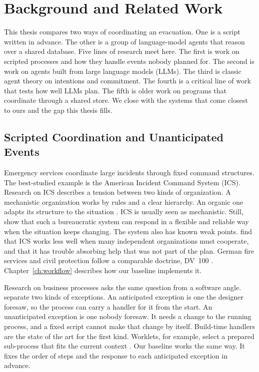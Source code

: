 \chapter{Background and Related Work}
\label{ch:background}

This thesis compares two ways of coordinating an evacuation. One is a script
written in advance. The other is a group of language-model agents that reason
over a shared database. Five lines of research meet here. The first is work on
scripted processes and how they handle events nobody planned for. The second is
work on agents built from large language models (LLMs). The third is classic
agent theory on intentions and commitment. The fourth is a critical line of
work that tests how well LLMs plan. The fifth is older work on programs that
coordinate through a shared store. We close with the systems that
come closest to ours and the gap this thesis fills.

\section{Scripted Coordination and Unanticipated Events}
\label{sec:bg:workflow}

Emergency services coordinate large incidents through fixed command
structures. The best-studied example is the American Incident Command System
(ICS). Research on ICS describes a tension between two kinds of organization.
A mechanistic organization works by rules and a clear hierarchy. An organic one
adapts its structure to the situation \parencite{chang2017}. ICS is usually
seen as mechanistic. Still, \textcite{bigley2001a} show that such a
bureaucratic system can respond in a flexible and reliable way when the
situation keeps changing. The system also has known weak points.
\textcite{buck2006} find that ICS works less well when many independent
organizations must cooperate, and that it has trouble absorbing help that was
not part of the plan. German fire
services and civil protection follow a comparable doctrine, DV~100 \parencite{fwdv100}. Chapter~\ref{ch:workflow}
describes how our baseline implements it.

Research on business processes asks the same question from a software angle.
\textcite{reichert2012} separate two kinds of exceptions. An anticipated
exception is one the designer foresaw, so the process can carry a handler for
it from the start. An unanticipated exception is one nobody foresaw. It needs a
change to the running process, and a fixed script cannot make that change by
itself. Build-time handlers are the state of the art for the first kind.
Worklets, for example, select a prepared sub-process that fits the current
context \parencite{adams2007}. Our baseline works the same way. It fixes the order of
steps and the response to each anticipated exception in advance.

